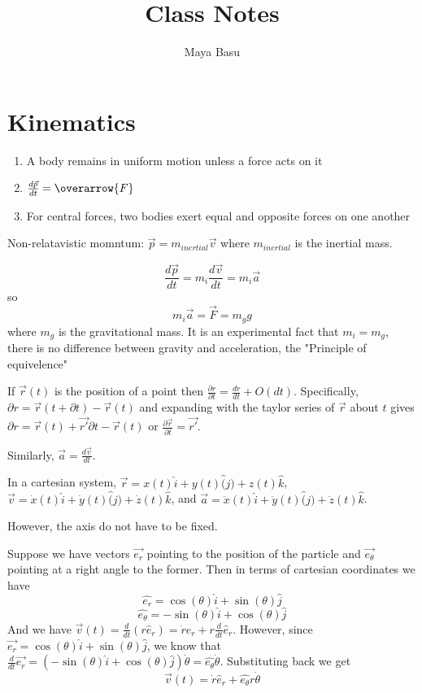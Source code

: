 \documentclass{homework}
\author{Maya Basu}
\title{Class Notes}
\begin{document}
 \maketitle

\section{Kinematics}
\begin{enumerate}
    \item A body remains in uniform motion unless a force acts on it
    \item $\frac{d\vec{p}}{dt} = \overarrow{F}$ 
    \item For central forces, two bodies exert equal and opposite forces on one another
\end{enumerate}
Non-relatavistic momntum: $\vec{p} = m_{inertial}\vec{v}$ where $m_{inertial}$ is the inertial mass.

\[\frac{d\vec{p}}{dt} = m_i\frac{d\vec{v}}{dt} = m_i\vec{a}\]
so
\[m_i\vec{a} = \vec{F} = m_gg\]
where $m_g$ is the gravitational mass. It is an experimental fact that $m_i = m_g$, there is no difference between gravity and acceleration, the "Principle of equivelence"


If $\vec{r}(t)$ is the position of a point then $\frac{\partial r}{\partial t} = \frac{dr}{dt} + O(dt)$. Specifically, $\partial r = \vec{r}(t + \partial t) - \vec{r}(t)$ and expanding with the taylor series of $\vec{r}$ about $t$ gives $\partial r = \vec{r}(t) + \vec{r'}\partial t - \vec{r}(t)$ or $\frac{\partial \vec{r}}{\partial t} = \vec{r'}$.

Similarly, $\vec{a} = \frac{d\vec{v}}{dt}$.

In a cartesian system, $\vec{r} = x(t)\hat{i} + y(t)\hat(j) + z(t)\hat{k}$, $\vec{v} = \dot{x}(t)\hat{i} + \dot{y}(t)\hat(j) + \dot{z}(t)\hat{k}$, and  $\vec{a} = \ddot{x}(t)\hat{i} + \ddot{y}(t)\hat(j) + \ddot{z}(t)\hat{k}$.

However, the axis do not have to be fixed. 

Suppose we have vectors $\vec{e_r}$ pointing to the position of the particle and $\vec{e_{\theta}}$ pointing at a right angle to the former. Then in terms of cartesian coordinates we have
\[\hat{e_r} = \cos(\theta)\hat i + \sin (\theta) \hat j\]
\[\hat{e_{\theta}} = -\sin(\theta)\hat i + \cos (\theta) \hat j\]
And we have $\vec{v}(t) = \frac{d}{dt}(r\hat e_r) = \dot r \hat e_r + r \frac{d}{dt}\hat e_r $. However, since $\vec{e_r} = \cos(\theta)\hat i + \sin (\theta) \hat j$, we know that $\frac{d}{dt}\vec{e_r} = (-\sin(\theta)\hat i + \cos (\theta) \hat j)\dot{\theta} = \hat{e_{\theta}}\dot{\theta}$. Substituting back we get 
\[\vec{v}(t) = \dot r \hat e_r + \hat{e_{\theta}}r\dot{\theta}\]
\end{document}
